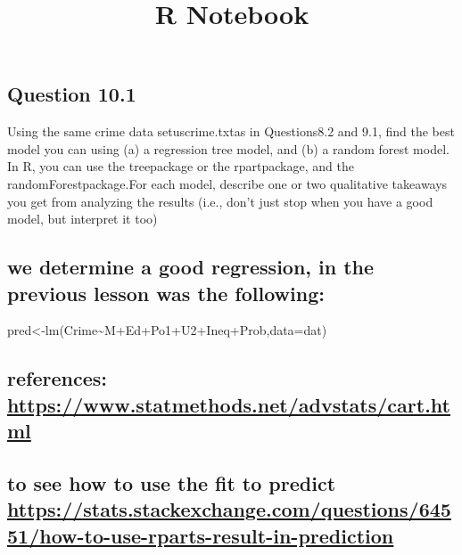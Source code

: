 \documentclass[]{article}
\title{R Notebook}
\author{}
\date{}
\begin{document}
\maketitle

\hypertarget{question-10.1}{%
\subsection{Question 10.1}\label{question-10.1}}

Using the same crime data setuscrime.txtas in Questions8.2 and 9.1, find
the best model you can using (a) a regression tree model, and (b) a
random forest model. In R, you can use the treepackage or the
rpartpackage, and the randomForestpackage.For each model, describe one
or two qualitative takeaways you get from analyzing the results (i.e.,
don't just stop when you have a good model, but interpret it too)

\hypertarget{we-determine-a-good-regression-in-the-previous-lesson-was-the-following}{%
\subsection{we determine a good regression, in the previous lesson was
the
following:}\label{we-determine-a-good-regression-in-the-previous-lesson-was-the-following}}

pred\textless-lm(Crime\textasciitilde M+Ed+Po1+U2+Ineq+Prob,data=dat)

\hypertarget{references-httpswww.statmethods.netadvstatscart.html}{%
\subsection{\texorpdfstring{references:
\url{https://www.statmethods.net/advstats/cart.html}}{references: https://www.statmethods.net/advstats/cart.html}}\label{references-httpswww.statmethods.netadvstatscart.html}}

\hypertarget{to-see-how-to-use-the-fit-to-predict-httpsstats.stackexchange.comquestions64551how-to-use-rparts-result-in-prediction}{%
\subsection{\texorpdfstring{to see how to use the fit to predict
\url{https://stats.stackexchange.com/questions/64551/how-to-use-rparts-result-in-prediction}}{to see how to use the fit to predict https://stats.stackexchange.com/questions/64551/how-to-use-rparts-result-in-prediction}}\label{to-see-how-to-use-the-fit-to-predict-httpsstats.stackexchange.comquestions64551how-to-use-rparts-result-in-prediction}}
\end{document}
